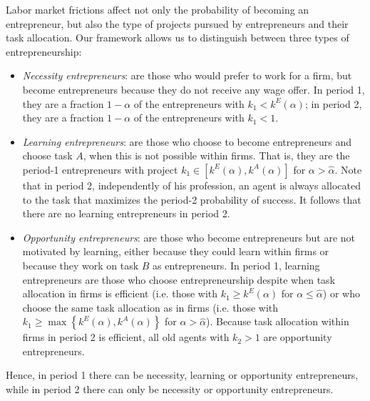 \documentclass[12pt,american]{paper}
\theoremstyle{remark}
\begin{document}
Labor market frictions affect not only the probability of becoming an entrepreneur, but also the type of projects pursued by entrepreneurs and their task allocation. Our framework allows us to distinguish between three types of entrepreneurship: 
\begin{itemize}
\item \textit{Necessity entrepreneurs}: are those who would prefer to work for a firm, but become entrepreneurs because they do not receive any wage offer. In period 1, they are a fraction $1-\alpha$ of the entrepreneurs with $k_1 < k^E(\alpha)$; in period 2, they are a fraction $1-\alpha$ of the entrepreneurs with $k_1 < 1$.
    \item \textit{Learning entrepreneurs}: are those who choose to become entrepreneurs and choose task $A$, when this is not possible within firms. That is, they are the period-1 entrepreneurs with project $k_1 \in [k^E(\alpha), k^A(\alpha)]$ for $\alpha > \hat \alpha$. Note that in period 2, independently of his profession, an agent is always allocated to the task that maximizes the period-2 probability of success. It follows that there are no learning entrepreneurs in period 2.
     \item \textit{Opportunity entrepreneurs}: are those who become entrepreneurs but are not motivated by learning, either because they could learn within firms or because they work on task $B$ as entrepreneurs. In period 1, learning entrepreneurs are those who choose entrepreneurship despite when task allocation in firms is efficient (i.e. those with $k_1 \geq k^E(\alpha)$ for $\alpha \leq \hat \alpha$) or who choose the same task allocation as in firms (i.e. those with $k_1 \geq \max\left\lbrace k^E(\alpha), k^A(\alpha) \right\rbrace$ for $\alpha > \hat \alpha$). Because task allocation within firms in period 2 is efficient, all old agents with $k_2 > 1$ are opportunity entrepreneurs.
\end{itemize}
Hence, in period 1 there can be necessity, learning or opportunity entrepreneurs, while in period 2 there can only be necessity or opportunity entrepreneurs.
\end{document}

